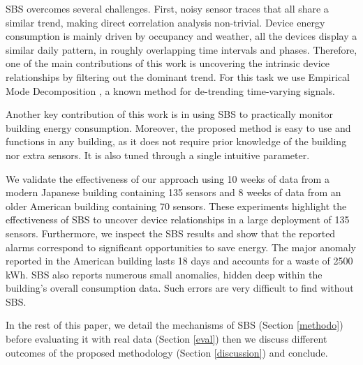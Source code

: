 SBS overcomes several challenges.  First, 
noisy sensor traces that all share a similar trend, making direct correlation analysis non-trivial.
Device energy consumption is mainly driven by occupancy and weather, all the devices display a similar daily pattern, in 
roughly overlapping time intervals and phases.
Therefore, one of the main contributions of this work is uncovering the intrinsic device relationships by filtering out the 
dominant trend.  For this task we use 
Empirical Mode Decomposition \cite{huang:emd1998}, a known method for de-trending time-varying signals.

Another key contribution of this work is in using SBS to practically monitor building energy consumption.
Moreover, the proposed method is easy to use and functions in any building, as it does not require prior knowledge of the building nor extra sensors.  
It is also tuned through a single intuitive parameter.  %

We validate the effectiveness of our approach using 10 weeks of data from a modern Japanese building containing 135 sensors and 
8 weeks of data from an older American building containing 70 sensors.
These experiments highlight the effectiveness of SBS to uncover device relationships in a large deployment of 135 sensors.
Furthermore, we inspect the SBS results and show that the reported alarms correspond to significant opportunities to save energy.
The major anomaly reported in the American building lasts 18 days and accounts for a waste of 2500 kWh. %
SBS also reports numerous small anomalies, hidden deep within the building's overall consumption data.  Such errors are very difficult to find
without SBS.

In the rest of this paper, we detail the mechanisms of SBS (Section \ref{methodo}) before evaluating it with real data (Section \ref{eval}) then we discuss different outcomes of the proposed methodology (Section \ref{discussion}) and conclude.


